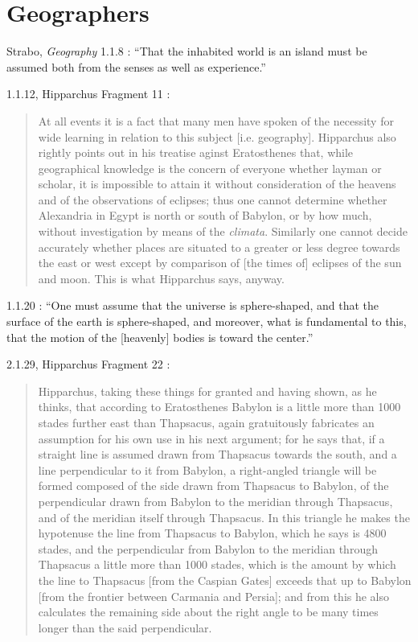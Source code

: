 \documentclass{amsart}
\theoremstyle{definition}
\begin{document}
\section{Geographers}
Strabo, {\em Geography} 1.1.8 \cite[p.~40]{strabo}: ``That the inhabited world is an island must be assumed both from the senses as well
as experience.''

1.1.12, Hipparchus Fragment 11 \cite[p.~65]{dicks}:

\begin{quote}
At all events it is a fact that many men have spoken of the
necessity for wide learning in relation to this subject [i.e.
geography]. Hipparchus also rightly points out in his treatise
aginst Eratosthenes that, while geographical knowledge is the
concern of everyone whether layman or scholar, it is impossible
to attain it without consideration of the heavens and of the
observations of eclipses; thus one cannot determine whether
Alexandria in Egypt is north or south of Babylon, or by how
much, without investigation by means of the {\em climata}. Similarly
one cannot decide accurately whether places are situated to
a greater or less degree towards the east or west except by
comparison of [the times of] eclipses of the sun and moon.
This is what Hipparchus says, anyway.
\end{quote}

1.1.20  \cite[p.~45]{strabo}: ``One must assume that the universe is sphere-shaped,
and that the surface of the earth is sphere-shaped, and moreover, what is fundamental
to this, that the motion of the [heavenly] bodies is toward the center.'' 

2.1.29, Hipparchus Fragment 22  \cite[pp.~73--75]{dicks}:

\begin{quote}
Hipparchus, taking these things for granted and having shown,
as he thinks, that according to Eratosthenes Babylon is a little
more than 1000 stades further east than Thapsacus, again
gratuitously fabricates an assumption for his own use in his
next argument; for he says that, if a straight line is assumed
drawn from Thapsacus towards the south, and a line
perpendicular to it from Babylon, a right-angled triangle will be
formed composed of the side drawn from Thapsacus to Babylon,
of the perpendicular drawn from Babylon to the meridian
through Thapsacus, and of the meridian itself through
Thapsacus. In this triangle he makes the hypotenuse the line from
Thapsacus to Babylon, which he says is 4800 stades, and the
perpendicular from Babylon to the meridian through
Thapsacus a little more than 1000 stades, which is the amount by
which the line to Thapsacus [from the Caspian Gates] exceeds
that up to Babylon [from the frontier between Carmania and Persia];
and from this he also calculates the remaining side
about the right angle to be many times longer than the said
perpendicular.
\end{quote}
\end{document}

